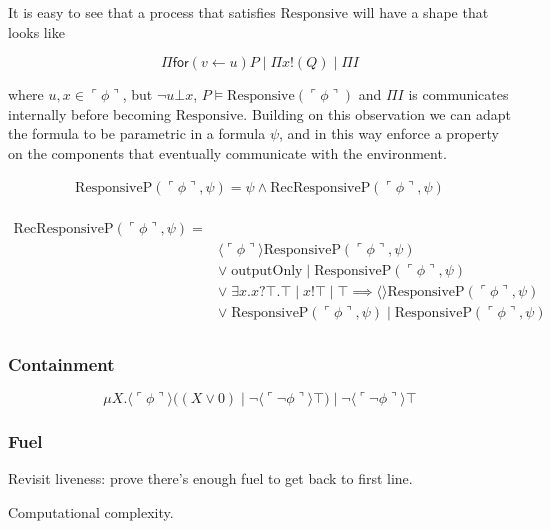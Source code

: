 \documentclass{llncs}
\newcommand{\lpquote}{\ulcorner}
\newcommand{\rpquote}{\urcorner}
\newcommand{\quotep}[1]{\lpquote #1 \rpquote}
\begin{document}
It is easy to see that a process that satisfies $\mbox{Responsive}$ will have a shape that
looks like

\[\Pi\mathsf{for}( v \leftarrow u )P \;|\; \Pi x!(Q) \;|\; \Pi I\]

where $u, x \in \quotep{\phi}$, but $\neg u \bot x$, $P \models \mbox{Responsive}(\quotep{\phi})$ and $\Pi I$ is communicates internally before becoming
$\mbox{Responsive}$. Building on this observation we can adapt the
formula to be parametric in a formula $\psi$, and in this way enforce
a property on the components that eventually communicate with the environment.

\[\begin{array}{rl}
\mbox{ResponsiveP}( \quotep{\phi}, \psi ) = \psi \land \mbox{RecResponsiveP}( \quotep{\phi}, \psi ) \\
\end{array}\]

\[\begin{array}{rl}
\mbox{RecResponsiveP}( \quotep{\phi}, \psi ) = & \\
  & \langle \quotep{\phi} \rangle \mbox{ResponsiveP}( \quotep{\phi}, \psi ) \\
  & \lor\; \mbox{outputOnly}\; | \;\mbox{ResponsiveP}( \quotep{\phi}, \psi ) \\
  & \lor\; \exists x. x?\top.\top \;|\; x!\top \;|\; \top \implies \langle\rangle \mbox{ResponsiveP}( \quotep{\phi}, \psi )\\
  & \lor\; \mbox{ResponsiveP}( \quotep{\phi}, \psi ) \; | \;\mbox{ResponsiveP}( \quotep{\phi}, \psi ) \\
\end{array}\]

\subsubsection{Containment}
\[ \mu X. \langle \quotep{\phi} \rangle ((X \lor 0)\;|\;\neg\langle\quotep{\neg \phi}\rangle\top)\;|\;\neg\langle\quotep{\neg \phi}\rangle\top \]
\subsubsection{Fuel}
Revisit liveness: prove there's enough fuel to get back to first line.

Computational complexity.



\end{document}
